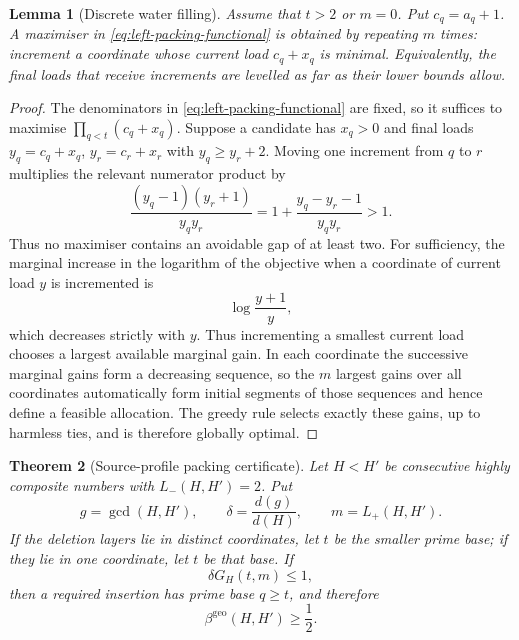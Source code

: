 \documentclass[11pt]{article}
\numberwithin{equation}{section}
\theoremstyle{blueplain}
\newtheorem{theorem}{Theorem}[section]
\newtheorem{lemma}[theorem]{Lemma}
\theoremstyle{bluedef}
\newcommand{\betageo}{\beta^{\mathrm{geo}}}
\begin{document}
\begin{lemma}[Discrete water filling]
\label{lem:water-filling}
Assume that $t>2$ or $m=0$.  Put $c_q=a_q+1$.  A maximiser in \eqref{eq:left-packing-functional} is obtained by repeating $m$ times: increment a coordinate whose current load $c_q+x_q$ is minimal.  Equivalently, the final loads that receive increments are levelled as far as their lower bounds allow.
\end{lemma}

\begin{proof}
The denominators in \eqref{eq:left-packing-functional} are fixed, so it suffices to maximise $\prod_{q<t}(c_q+x_q)$.  Suppose a candidate has $x_q>0$ and final loads $y_q=c_q+x_q$, $y_r=c_r+x_r$ with $y_q\ge y_r+2$.  Moving one increment from $q$ to $r$ multiplies the relevant numerator product by
\[
 \frac{(y_q-1)(y_r+1)}{y_qy_r}
 =1+\frac{y_q-y_r-1}{y_qy_r}>1.
\]
 Thus no maximiser contains an avoidable gap of at least two.  For sufficiency, the marginal increase in the logarithm of the objective when a coordinate of current load $y$ is incremented is
\[
 \log\frac{y+1}{y},
\]
which decreases strictly with $y$.  Thus incrementing a smallest current load chooses a largest available marginal gain.  In each coordinate the successive marginal gains form a decreasing sequence, so the $m$ largest gains over all coordinates automatically form initial segments of those sequences and hence define a feasible allocation.  The greedy rule selects exactly these gains, up to harmless ties, and is therefore globally optimal.
\end{proof}

\begin{theorem}[Source-profile packing certificate]
\label{thm:source-packing}
Let $H<H'$ be consecutive highly composite numbers with $L_-(H,H')=2$.  Put
\[
 g=\gcd(H,H'),
 \qquad
 \delta=\frac{d(g)}{d(H)},
 \qquad
 m=L_+(H,H').
\]
If the deletion layers lie in distinct coordinates, let $t$ be the smaller prime base; if they lie in one coordinate, let $t$ be that base.  If
\begin{equation}
 \boxed{\delta G_H(t,m)\le1,}
 \label{eq:source-packing-condition}
\end{equation}
then a required insertion has prime base $q\ge t$, and therefore
\begin{equation}
 \boxed{\betageo(H,H')\ge\frac12.}
 \label{eq:source-packing-half}
\end{equation}
\end{theorem}
\end{document}
